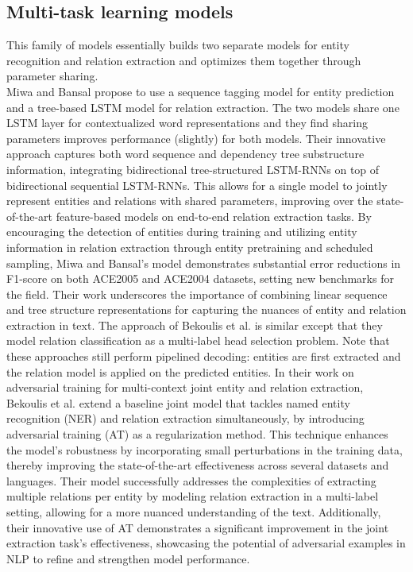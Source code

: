 \subsection{Multi-task learning models}
This family of models essentially builds two separate models for entity recognition and relation extraction and optimizes them together through parameter sharing.\\
Miwa and Bansal\cite{miwa-bansal-2016-end} propose to use a sequence tagging model for entity prediction and a tree-based LSTM model for relation extraction. The two models share one LSTM layer for contextualized word representations and they find sharing parameters improves performance (slightly) for both models. Their innovative approach captures both word sequence and dependency tree substructure information, integrating bidirectional tree-structured LSTM-RNNs on top of bidirectional sequential LSTM-RNNs. This allows for a single model to jointly represent entities and relations with shared parameters, improving over the state-of-the-art feature-based models on end-to-end relation extraction tasks. By encouraging the detection of entities during training and utilizing entity information in relation extraction through entity pretraining and scheduled sampling, Miwa and Bansal's model demonstrates substantial error reductions in F1-score on both ACE2005 and ACE2004 datasets, setting new benchmarks for the field. Their work underscores the importance of combining linear sequence and tree structure representations for capturing the nuances of entity and relation extraction in text.
The approach of Bekoulis et al.\cite{bekoulis-etal-2018-adversarial} is similar except that they model relation classification as a multi-label head selection problem. Note that these approaches still perform pipelined decoding: entities are first extracted and the relation model is applied on the predicted entities. In their work on adversarial training for multi-context joint entity and relation extraction, Bekoulis et al. extend a baseline joint model that tackles named entity recognition (NER) and relation extraction simultaneously, by introducing adversarial training (AT) as a regularization method. This technique enhances the model's robustness by incorporating small perturbations in the training data, thereby improving the state-of-the-art effectiveness across several datasets and languages. Their model successfully addresses the complexities of extracting multiple relations per entity by modeling relation extraction in a multi-label setting, allowing for a more nuanced understanding of the text. Additionally, their innovative use of AT demonstrates a significant improvement in the joint extraction task's effectiveness, showcasing the potential of adversarial examples in NLP to refine and strengthen model performance.\\
